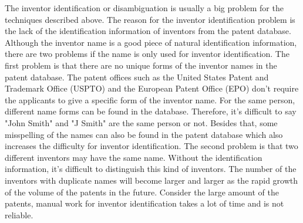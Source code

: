 The inventor identification or disambiguation is usually a big problem for the techniques described above. The reason for the inventor identification problem is the lack of the identification information of inventors from the patent database. Although the inventor name is a good piece of natural identification information, there are two problems if the name is only used for inventor identification. The first problem is that there are no unique forms of the inventor names in the patent database. The patent offices such as the United States Patent and Trademark Office (USPTO) and the European Patent Office (EPO)  don't require the applicants to give a specific form of the inventor name. For the same person, different name forms can be found in the database. Therefore, it's difficult to say "John Smith" and "J Smith" are the same person or not. Besides that, some misspelling of the names can also be found in the patent database which also increases the difficulty for inventor identification. The second problem is that two different inventors may have the same name. Without the identification information, it's difficult to distinguish this kind of inventors. The number of the inventors with duplicate names will become larger and larger as the rapid growth of the volume of the patents in the future. Consider the large amount of the patents, manual work for inventor identification takes a lot of time and is not reliable.  

